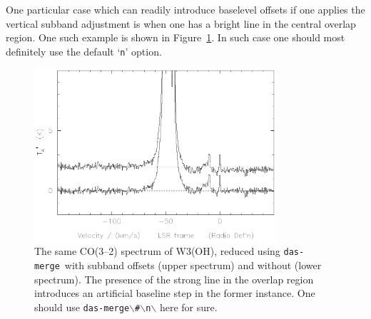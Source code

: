 \documentclass[11pt,twoside]{starlink}
\providecommand{\dm}{\texttt{das-merge}}
\begin{document}
One particular case which can readily introduce baselevel offsets if one
applies the vertical subband adjustment is when one has a bright line
in the central overlap region. One such example is shown in
Figure~\ref{fig:dasmerge_yn}. In such case one should most definitely
use the default `{\tt{n}}' option.
%
\begin{figure}[ht]
\centering
\includegraphics[width=0.8\textwidth]{sc8_dasmerge_yn}
\caption[\dm ; yes or no]
{\small{The same CO(3--2) spectrum of W3(OH), reduced using \dm\ with
subband offsets (upper spectrum) and without (lower spectrum). The
presence of the strong line in the overlap region introduces an
artificial baseline step in the former instance. One should use \texttt{das-merge$\backslash$\#$\backslash$n$\backslash$} here for sure.  }}
\label{fig:dasmerge_yn}
\end{figure}
\end{document}
